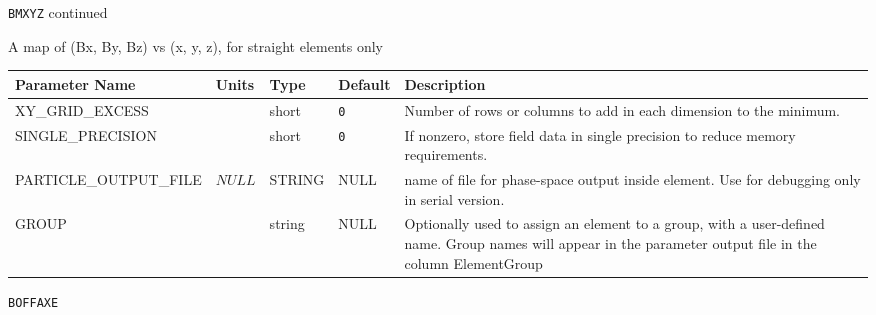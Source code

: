 \newpage
\begin{center}{\Large\verb|BMXYZ| continued}\end{center}
A map of (Bx, By, Bz) vs (x, y, z), for straight elements only
\\
\begin{tabular}{|l|l|l|l|p{\descwidth}|} \hline
Parameter Name & Units & Type & Default & Description \\ \hline 
XY\_GRID\_EXCESS &  & short &  \verb|0| & Number of rows or columns to add in each dimension to the minimum.  \\ \hline 
SINGLE\_PRECISION &  & short &  \verb|0| & If nonzero, store field data in single precision to reduce memory requirements.  \\ \hline 
PARTICLE\_OUTPUT\_FILE & $NULL$ & STRING &   NULL            & name of file for phase-space output inside element. Use for debugging only in serial version.  \\ \hline 
GROUP &  & string & NULL & Optionally used to assign an element to a group, with a user-defined name.  Group names will appear in the parameter output file in the column ElementGroup  \\ \hline 
\end{tabular}

\vspace*{0.5in}

\newpage
\begin{center}{\Large\verb|BOFFAXE|}\end{center}
